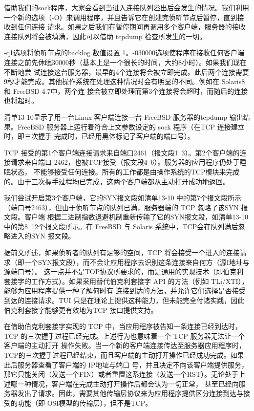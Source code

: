 借助我们的sock程序，大家会看到当进入连接队列溢出后会发生的情况。我们利用一个新的选项（-O）来调用程序，并且告诉它在创建完侦听节点后暂停，直到接收到任何连接
请求。如果之后我们在暂停期间再调用多个客户端，服务器的接收连接队列将会被填满，因此可以借助 tcpdump 检查所发生的一切。

-q1选项将侦听节点的backlog 数值设置 1。-030000选项使程序在接收任何客户端连接之前先休眠30000秒（基本上是一个很长的时间，大约8小时）。如果我们现在不断地尝
试连接这台服务器，最早的4个连接将会被立即完成。此后两个连接需要9秒才能完成。其他操作系统在处理这种情况时会有明显的不同。例如在 Solaris8和 FreeBSD 4.7中，两个连
接会被立即处理而第3个连接将会超时，而随后的连接也将超时。

清单13-10显示了用一台Linux 客户端连接一台 FreeBSD 服务器的tcpdump 输出结果。FreeBSD 服务器上运行着符合上文参数设定的 sock 程序（在TCP 连接建立时，即三次握手
完成时，已经用黑体标记了客户端的端口号）。

TCP 接受的第1个客户端连接请求来自端口2461（报文段1~3）。第2个客户端的连接请求来自端口 2462，也被TCP接受（报文段4~6）。服务器的应用程序仍处于睡眠状态，
不能够接受任何连接。所有的工作都是由操作系统的TCP模块来完成的。由于三次握手过程均已完成，这两个客户端都从主动打开成功地返回。

我们尝试开启第3个客户端，它的SYN报文段如清单13-10 中的第7个报文段所示（端口号2463），但由于侦听节点的队列已满，服务器端的 TCP 忽略了该SYN 报文段。客户端
根据二进制指数退避机制重新传输了它的SYN报文段，如清单13-10中的第8~12个报文段所示。在 FreeBSD 与 Solaris 系统中，TCP会在队列满后忽略进入的SYN 报文段。

据前文所述，如果侦听者的队列有足够的空间，TCP 将会接受一个进入的连接请求（即一个SYN报文段），而不会让应用程序去识别这条连接来自何方（源I地址与源端口号）。
这一点并不是TOP协议所要求的，而是通用的实现技术（即伯克利套接字的工作方式）。如果采用替代伯克利套接字 API 的方法（例如 TLi/XTI），能够为应用程序提供一种了解何时有
连接到达的方法，并允许它们选择是否接受到达的连接请求。TUI 只是在理论上提供这种能力，但未能完全付诸实践，因此伯克利套接字能够更有效地为TCP 接口提供文持。

在借助伯克利套接字实现的 TCP 中，当应用程序被告知一条连接已经到达时，TCP 的三次握手过程已经完成。上述行为也意味着一个 TCP 服务器无法让一个客户端的主动打开
操作失败。当一个新的客户端连接传达至服务器应用程序时，TCP的三次握手过程已经结束，而且客户端的主动打开操作已经成功完成。如果此后服务器查看了客户端的 IP地址与端口
号，并且决定不向该客户端提供服务，那它只能关闭（发送一个FIN）或者重置这系连接（发送一个RST）。无论处于上述哪一种情况，客户端在完成主动打开操作后都会认为一切正常，
甚至已经向服务器发出了请求。因此，需要其他传输层协议来为应用程序提供区分连接到达与接受的功能（即 OSI模型的传输层），但不是TCP。
